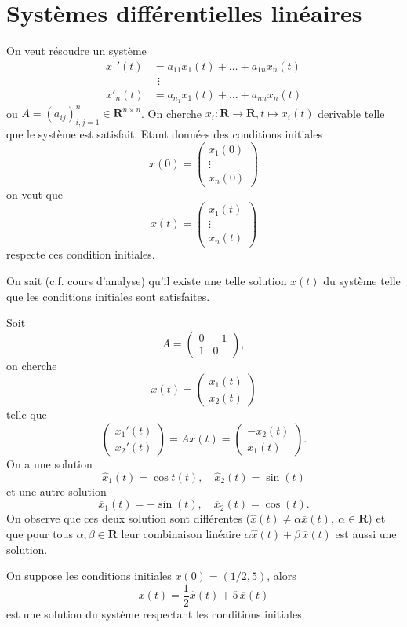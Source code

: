 \chapter{Systèmes différentielles linéaires}
On veut résoudre un système
\begin{align*}
x_{1}'(t) & =a_{11}x_{1}(t)+\dots +a_{1n}x_{n}(t) \\
 & ~~\vdots \\
x'_{n}(t)  & =a_{n_{1}}x_{1}(t)+\dots +a_{nn}x_{n}(t)
\end{align*}
ou $A=(a_{ij})^{n}_{i,j=1}\in \mathbf{R}^{n\times n}$. On cherche $x_{i}:\mathbf{R}\to \mathbf{R},t\mapsto x_{i}(t)$ derivable telle que le système est satisfait. Etant données des conditions initiales 
$$
x(0)=\begin{pmatrix}
x_{1}(0) \\
\vdots \\
x_{n}(0)
\end{pmatrix}
$$
on veut que 
$$
x(t)=\begin{pmatrix}
x_{1}(t) \\
\vdots \\
x_{n}(t)
\end{pmatrix}
$$
respecte ces condition initiales.
\begin{remark}
On sait (c.f. cours d'analyse) qu'il existe une telle solution $x(t)$ du système telle que les conditions initiales sont satisfaites.
\end{remark}
\begin{example}\label{exe2101}
Soit
$$
A=\begin{pmatrix}
0 & -1  \\
1 & 0
\end{pmatrix},
$$
on cherche
$$
x(t)=\begin{pmatrix}
x_{1}(t) \\
x_{2}(t)
\end{pmatrix}
$$
telle que 
$$
\begin{pmatrix}
x_{1}'(t) \\
x_{2}'(t)
\end{pmatrix}=Ax(t)=\begin{pmatrix}
-x_{2}(t) \\
x_{1}(t)
\end{pmatrix}.
$$
On a une solution
$$
\hat{x}_{1}(t)=\cos t(t),\quad \hat{x}_{2}(t)=\sin (t)
$$
et une autre solution
$$
\overline{x}_{1}(t)=-\sin (t),\quad \overline{x}_{2}(t)=\cos(t).
$$
On observe que ces deux solution sont différentes ($\hat{x}(t)\neq\alpha \overline{x}(t),~ \alpha \in \mathbf{R}$) et que pour tous $\alpha,\beta \in \mathbf{R}$ leur combinaison linéaire $\alpha \hat{x}(t)+\beta \,\overline{x}(t)$ est aussi une solution. 

On suppose les conditions initiales $x(0)=(1/2,5)$, alors 
$$
x(t)=\frac{1}{2}\hat{x}(t)+5\, \overline{x}(t)
$$
est une solution du système respectant les conditions initiales.
\end{example}
